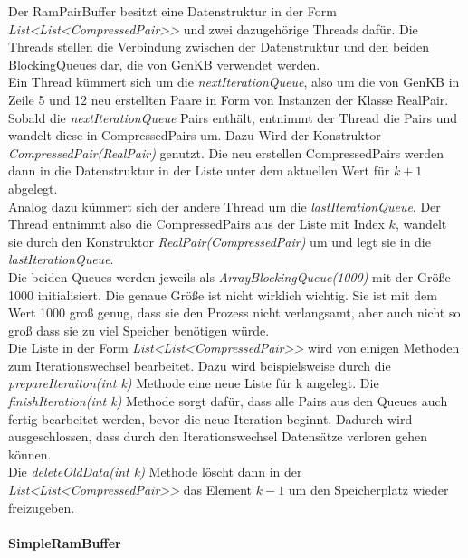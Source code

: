 \documentclass[12pt,a4paper]{article}
\begin{document}
Der RamPairBuffer besitzt eine Datenstruktur in der Form \textit{List<List<CompressedPair>>} und zwei dazugehörige Threads dafür. Die Threads stellen die Verbindung zwischen der Datenstruktur und den beiden BlockingQueues dar, die von GenKB verwendet werden. \\
Ein Thread kümmert sich um die \textit{nextIterationQueue}, also um die von GenKB in Zeile 5 und 12  neu erstellten Paare in Form von Instanzen der Klasse RealPair. Sobald die \textit{nextIterationQueue} Pairs enthält, entnimmt der Thread die Pairs und wandelt diese in CompressedPairs um. Dazu Wird der Konstruktor \textit{CompressedPair(RealPair)} genutzt. Die neu erstellen CompressedPairs werden dann in die Datenstruktur in der Liste unter dem aktuellen Wert für $k+1$ abgelegt. \\
Analog dazu kümmert sich der andere Thread um die \textit{lastIterationQueue}. Der Thread entnimmt also die CompressedPairs aus der Liste mit Index $k$, wandelt sie durch den Konstruktor \textit{RealPair(CompressedPair)} um und legt sie in die \textit{lastIterationQueue}. \\
Die beiden Queues werden jeweils als \textit{ArrayBlockingQueue(1000)} mit der Größe 1000 initialisiert. Die genaue Größe ist nicht wirklich wichtig. Sie ist mit dem Wert 1000 groß genug, dass sie den Prozess nicht verlangsamt, aber auch nicht so groß dass sie zu viel Speicher benötigen würde. \\
Die Liste in der Form \textit{List<List<CompressedPair>>} wird von einigen Methoden zum Iterationswechsel bearbeitet. Dazu wird beispielsweise durch die \textit{prepareIteraiton(int k)} Methode eine neue Liste für k angelegt. Die \textit{finishIteration(int k)} Methode sorgt dafür, dass alle Pairs aus den Queues auch fertig bearbeitet werden, bevor die neue Iteration beginnt. Dadurch wird ausgeschlossen, dass durch den Iterationswechsel Datensätze verloren gehen können. \\
Die \textit{deleteOldData(int k)} Methode löscht dann in der \textit{List<List<CompressedPair>>} das Element $k-1$ um den Speicherplatz wieder freizugeben.


\paragraph{SimpleRamBuffer}\mbox{}
\label{sec:simplerambuffer}
\end{document}
